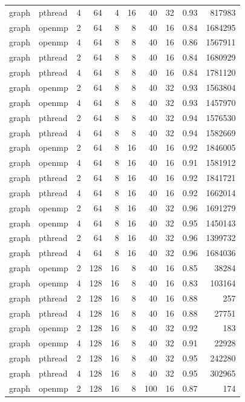 \documentclass[a4paper]{article}
\begin{document}
{\begin{longtable}{lllrrrrrrr}
graph & pthread & 4 & 64 & 4 & 16 & 40 & 32 & 0.93 & 817983 \\
graph & openmp & 2 & 64 & 8 & 8 & 40 & 16 & 0.84 & 1684295 \\
graph & openmp & 4 & 64 & 8 & 8 & 40 & 16 & 0.86 & 1567911 \\
graph & pthread & 2 & 64 & 8 & 8 & 40 & 16 & 0.84 & 1680929 \\
graph & pthread & 4 & 64 & 8 & 8 & 40 & 16 & 0.84 & 1781120 \\
graph & openmp & 2 & 64 & 8 & 8 & 40 & 32 & 0.93 & 1563804 \\
graph & openmp & 4 & 64 & 8 & 8 & 40 & 32 & 0.93 & 1457970 \\
graph & pthread & 2 & 64 & 8 & 8 & 40 & 32 & 0.94 & 1576530 \\
graph & pthread & 4 & 64 & 8 & 8 & 40 & 32 & 0.94 & 1582669 \\
graph & openmp & 2 & 64 & 8 & 16 & 40 & 16 & 0.92 & 1846005 \\
graph & openmp & 4 & 64 & 8 & 16 & 40 & 16 & 0.91 & 1581912 \\
graph & pthread & 2 & 64 & 8 & 16 & 40 & 16 & 0.92 & 1841721 \\
graph & pthread & 4 & 64 & 8 & 16 & 40 & 16 & 0.92 & 1662014 \\
graph & openmp & 2 & 64 & 8 & 16 & 40 & 32 & 0.96 & 1691279 \\
graph & openmp & 4 & 64 & 8 & 16 & 40 & 32 & 0.95 & 1450143 \\
graph & pthread & 2 & 64 & 8 & 16 & 40 & 32 & 0.96 & 1399732 \\
graph & pthread & 4 & 64 & 8 & 16 & 40 & 32 & 0.96 & 1684036 \\
graph & openmp & 2 & 128 & 16 & 8 & 40 & 16 & 0.85 & 38284 \\
graph & openmp & 4 & 128 & 16 & 8 & 40 & 16 & 0.83 & 103164 \\
graph & pthread & 2 & 128 & 16 & 8 & 40 & 16 & 0.88 & 257 \\
graph & pthread & 4 & 128 & 16 & 8 & 40 & 16 & 0.88 & 27751 \\
graph & openmp & 2 & 128 & 16 & 8 & 40 & 32 & 0.92 & 183 \\
graph & openmp & 4 & 128 & 16 & 8 & 40 & 32 & 0.91 & 22928 \\
graph & pthread & 2 & 128 & 16 & 8 & 40 & 32 & 0.95 & 242280 \\
graph & pthread & 4 & 128 & 16 & 8 & 40 & 32 & 0.95 & 302965 \\
graph & openmp & 2 & 128 & 16 & 8 & 100 & 16 & 0.87 & 174 \\

\end{longtable}}
\end{document}
